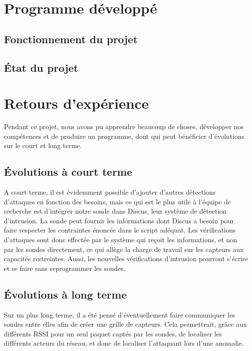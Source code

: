 \section{Programme développé}
	\subsection{Fonctionnement du projet}
	\subsection{État du projet}

\section{Retours d'expérience} %
    Pendant ce projet, nous avons pu apprendre beaucoup de choses, développer nos compétences et de produire un programme, dont qui peut bénéficier d'évolutions sur le court et long terme.
    
	\subsection{Évolutions à court terme} %
	A court terme, il est évidemment possible d'ajouter d'autres détections d'attaques en fonction des besoins, mais ce qui est le plus utile à l'équipe de recherche est d'intégrer notre sonde dans Discus, leur système de détection d'intrusion.
	La sonde peut fournir les informations dont Discus a besoin pour faire respecter les contraintes énoncée dans le script adéquat. 
	Les vérifications d'attaques sont donc effectée par le système qui reçoit les informations, et non par les sondes directement, ce qui allège la charge de travail sur les capteurs aux capacités restreintes. Aussi, les nouvelles vérifications d'intrusion pourront s'écrire et se faire sans reprogrammer les sondes.
	\subsection{Évolutions à long terme} %
	Sur un plus long terme, il a été pensé d'éventuellement faire communiquer les sondes entre elles afin de créer une grille de capteurs.
	Cela permettrait, grâce aux différents RSSI pour un seul paquet captés par les sondes, de localiser les différents acteurs du réseau, et donc de localiser l'attaquant lors d'une anomalie.
